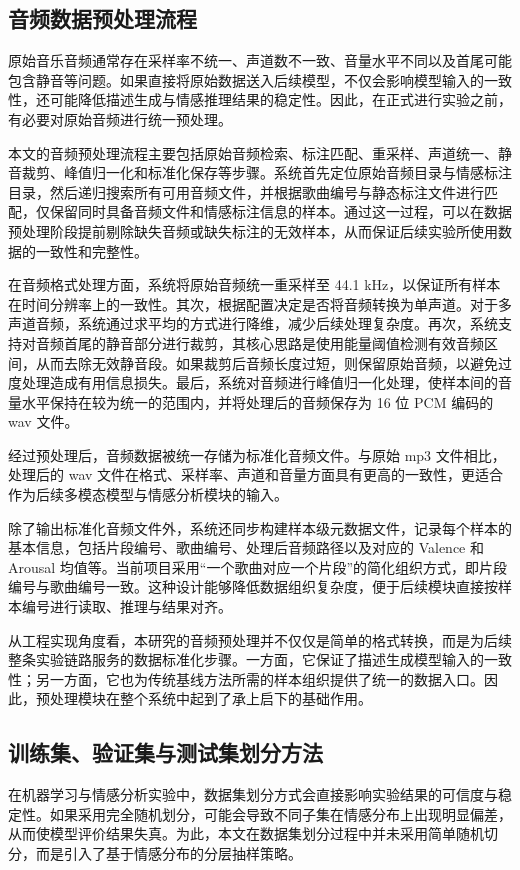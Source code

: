 \subsection{音频数据预处理流程}
原始音乐音频通常存在采样率不统一、声道数不一致、音量水平不同以及首尾可能包含静音等问题。如果直接将原始数据送入后续模型，不仅会影响模型输入的一致性，还可能降低描述生成与情感推理结果的稳定性。因此，在正式进行实验之前，有必要对原始音频进行统一预处理。

本文的音频预处理流程主要包括原始音频检索、标注匹配、重采样、声道统一、静音裁剪、峰值归一化和标准化保存等步骤。系统首先定位原始音频目录与情感标注目录，然后递归搜索所有可用音频文件，并根据歌曲编号与静态标注文件进行匹配，仅保留同时具备音频文件和情感标注信息的样本。通过这一过程，可以在数据预处理阶段提前剔除缺失音频或缺失标注的无效样本，从而保证后续实验所使用数据的一致性和完整性。

在音频格式处理方面，系统将原始音频统一重采样至 44.1 kHz，以保证所有样本在时间分辨率上的一致性。其次，根据配置决定是否将音频转换为单声道。对于多声道音频，系统通过求平均的方式进行降维，减少后续处理复杂度。再次，系统支持对音频首尾的静音部分进行裁剪，其核心思路是使用能量阈值检测有效音频区间，从而去除无效静音段。如果裁剪后音频长度过短，则保留原始音频，以避免过度处理造成有用信息损失。最后，系统对音频进行峰值归一化处理，使样本间的音量水平保持在较为统一的范围内，并将处理后的音频保存为 16 位 PCM 编码的 wav 文件。

经过预处理后，音频数据被统一存储为标准化音频文件。与原始 mp3 文件相比，处理后的 wav 文件在格式、采样率、声道和音量方面具有更高的一致性，更适合作为后续多模态模型与情感分析模块的输入。

除了输出标准化音频文件外，系统还同步构建样本级元数据文件，记录每个样本的基本信息，包括片段编号、歌曲编号、处理后音频路径以及对应的 Valence 和 Arousal 均值等。当前项目采用“一个歌曲对应一个片段”的简化组织方式，即片段编号与歌曲编号一致。这种设计能够降低数据组织复杂度，便于后续模块直接按样本编号进行读取、推理与结果对齐。

从工程实现角度看，本研究的音频预处理并不仅仅是简单的格式转换，而是为后续整条实验链路服务的数据标准化步骤。一方面，它保证了描述生成模型输入的一致性；另一方面，它也为传统基线方法所需的样本组织提供了统一的数据入口。因此，预处理模块在整个系统中起到了承上启下的基础作用。

\subsection{训练集、验证集与测试集划分方法}
在机器学习与情感分析实验中，数据集划分方式会直接影响实验结果的可信度与稳定性。如果采用完全随机划分，可能会导致不同子集在情感分布上出现明显偏差，从而使模型评价结果失真。为此，本文在数据集划分过程中并未采用简单随机切分，而是引入了基于情感分布的分层抽样策略。

